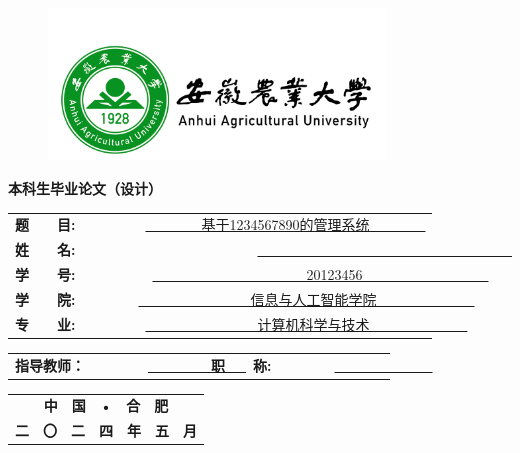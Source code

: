 \documentclass[UTF8,a4paper,12pt]{ctexart}
\begin{document}
	\vspace{5cm}
	\begin{figure}[!h]
		\centering
		\includegraphics[width=0.8\textwidth]{pic/校徽.pdf}
		\label{fig0}
	\end{figure}
	\textbf{\fontsize{36pt}{\baselineskip}本科生毕业论文（设计）}
	\vspace{3cm}
	\begin{table}[!h]
		\centering
		\renewcommand\arraystretch{1.5}
		\setlength\tabcolsep{20pt}
		\begin{tabular}{cc}
			\textbf{\heiti 题　　目:} & \underline{　　　　基于1234567890的管理系统　　　　}  \\ 
			\textbf{\heiti 姓　　名: }& \underline{　　　　　　　　　　　　　　　　　　　　　　　　}  \\ 
			\textbf{\heiti 学　　号: }& \underline{　　　　　　　　　　　20123456　　　　　　　　　}  \\ 
			\textbf{\heiti 学　　院: }&  \underline{　　　　　　　　信息与人工智能学院　　　　　　　}  \\ 
			\textbf{\heiti 专　　业: }& \underline{　　　　　　　　计算机科学与技术　　　　　　　}  \\
		\end{tabular}
	\end{table}
	\vspace{-0.75cm}
	\begin{table}[!h]
		\setlength\tabcolsep{19.2pt}
		\centering
		\begin{tabular}{cccc}
			\textbf{\heiti 指导教师：}&\underline{　　　　　　　}&\textbf{\heiti 职　　称:}&\underline{　　　　　　　 }\\
		\end{tabular}
	\end{table}
	\vspace{4cm} 
	\begin{table}[!h]
		\renewcommand\arraystretch{1.8}
		\setlength\tabcolsep{16pt}
		\centering
		\begin{tabular}{c}
			\textbf{\fontsize{16pt}{\baselineskip}\heiti 中　国　•　合　肥 }\\
			\textbf{\fontsize{16pt}{\baselineskip}\heiti 二　〇　二　四　年　五　月} \\
		\end{tabular}
	\end{table}
\end{document}
